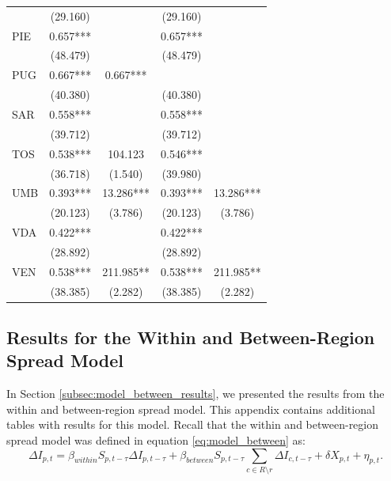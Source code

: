 \documentclass[12pt]{article}
\begin{document}
\begin{appendices}
\begin{longtable}{@{}lcccc@{}}
             & (29.160) &  & (29.160) &  \\ 
            PIE & 0.657*** &  & 0.657*** &  \\ 
             & (48.479) &  & (48.479) &  \\ 
            PUG & 0.667*** &  0.667*** &  \\ 
             & (40.380) &  & (40.380) &  \\ 
            SAR & 0.558*** &  & 0.558*** &  \\ 
             & (39.712) &  & (39.712) &  \\ 
            TOS & 0.538*** & 104.123 & 0.546*** &  \\ 
             & (36.718) & (1.540) & (39.980) &  \\ 
            UMB & 0.393*** & 13.286*** & 0.393*** & 13.286*** \\ 
             & (20.123) & (3.786) & (20.123) & (3.786) \\ 
            VDA & 0.422*** &  & 0.422*** &  \\ 
             & (28.892) &  & (28.892) &  \\ 
            VEN & 0.538*** & 211.985** & 0.538*** & 211.985** \\ 
             & (38.385) & (2.282) & (38.385) & (2.282) \\* \bottomrule
        \end{longtable}
		
		\subsection{Results for the Within and Between-Region Spread Model} \label{sapp:model_between_results}
		In Section \ref{subsec:model_between_results}, we presented the results from the within and between-region spread model. This appendix contains additional tables with results for this model. Recall that the within and between-region spread model was defined in equation \eqref{eq:model_between} as:
		    \begin{equation*}
        		\Delta I_{p,t} = \beta_{within}S_{p,t-\tau}\Delta I_{p,t-\tau} + \beta_{between}S_{p,t-\tau}\sum_{c \in R \setminus r} \Delta I_{c, t-\tau} + \delta X_{p,t} + \eta_{p,t}.
        	\end{equation*}
        

\end{appendices}
\end{document}
